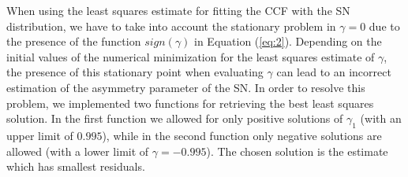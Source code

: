 \documentclass[11pt, oneside]{article}
\begin{document}





When using the least squares estimate for fitting the CCF with the SN distribution, we have to take into account the stationary problem in $\gamma=0$ due to the presence of the function $sign(\gamma)$ in Equation (\ref{eq:2}). Depending on the initial values of the numerical minimization for the least squares estimate of $\gamma$, the presence of this stationary point when evaluating $\gamma$ can lead to an incorrect estimation of the asymmetry parameter of the SN. In order to resolve this problem, we implemented two functions for retrieving the best least squares solution. In the first function we allowed for only positive solutions of $\gamma_1$ (with an upper limit of $0.995$), while in the second function only negative solutions are allowed (with a lower limit of $\gamma= -0.995$). The chosen solution is the estimate which has smallest residuals.
\end{document}

